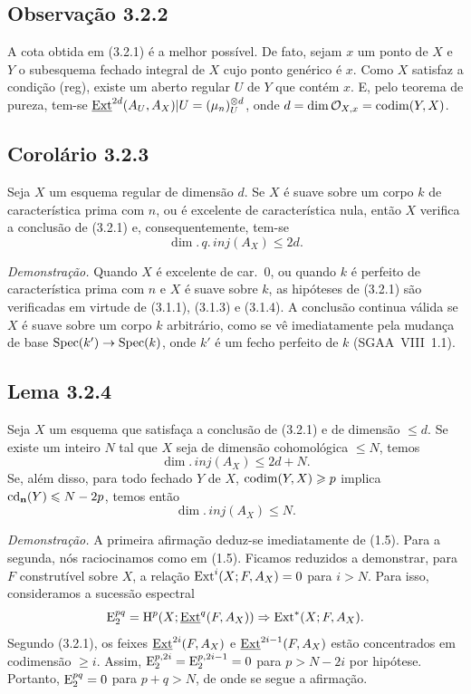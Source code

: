\subsection*{Observação 3.2.2}
A cota obtida em (3.2.1) é a melhor possível. De fato, sejam $x$ um ponto de $X$ e $Y$ o subesquema fechado integral de $X$ cujo ponto genérico é $x$. Como $X$ satisfaz a condição (reg), existe um aberto regular $U$ de $Y$ que contém $x$. E, pelo teorema de pureza, tem-se $\underline{\operatorname{Ext}}^{2d}(A_U, A_X)|U = (\mu_n)^{\otimes d}_U$, onde $d = \dim \mathcal{O}_{X,x} = \operatorname{codim}(Y,X)$.

\subsection*{Corolário 3.2.3}
Seja $X$ um esquema regular de dimensão $d$. Se $X$ é suave sobre um corpo $k$ de característica prima com $n$, ou é excelente de característica nula, então $X$ verifica a conclusão de (3.2.1) e, consequentemente, tem-se
\[
\dim.\,q.\,inj(A_X) \leqslant 2d.
\]

\emph{Demonstração.} Quando $X$ é excelente de car.~0, ou quando $k$ é perfeito de característica prima com $n$ e $X$ é suave sobre $k$, as hipóteses de (3.2.1) são verificadas em virtude de (3.1.1), (3.1.3) e (3.1.4). A conclusão continua válida se $X$ é suave sobre um corpo $k$ arbitrário, como se vê imediatamente pela mudança de base $\operatorname{Spec}(k') \to \operatorname{Spec}(k)$, onde $k'$ é um fecho perfeito de $k$ (SGAA~VIII~1.1).

\subsection*{Lema 3.2.4}
Seja $X$ um esquema que satisfaça a conclusão de (3.2.1) e de dimensão $\leqslant d$. Se existe um inteiro $N$ tal que $X$ seja de dimensão cohomológica $\leqslant N$, temos
\[
\dim.\,inj(A_X) \leqslant 2d + N.
\]
Se, além disso, para todo fechado $Y$ de $X$, $\operatorname{codim}(Y,X) \geqslant p$ implica $\operatorname{cd}_{\mathbf{n}}(Y) \leqslant N - 2p$, temos então
\[
\dim.\,inj(A_X) \leqslant N.
\]

\emph{Demonstração.} A primeira afirmação deduz-se imediatamente de (1.5). Para a segunda, nós raciocinamos como em (1.5). Ficamos reduzidos a demonstrar, para $F$ construtível sobre $X$, a relação $\operatorname{Ext}^i(X; F, A_X) = 0$ para $i > N$. Para isso, consideramos a sucessão espectral
\[
\mathrm{E}_2^{pq} = \mathrm{H}^p(X; \underline{\operatorname{Ext}}^q(F, A_X)) \Rightarrow \operatorname{Ext}^{*}(X; F, A_X).
\]
Segundo (3.2.1), os feixes $\underline{\operatorname{Ext}}^{2i}(F, A_X)$ e $\underline{\operatorname{Ext}}^{2i-1}(F, A_X)$ estão concentrados em codimensão $\geqslant i$. Assim, $\mathrm{E}_2^{p,2i} = \mathrm{E}_2^{p,2i-1} = 0$ para $p > N - 2i$ por hipótese. Portanto, $\mathrm{E}_2^{pq} = 0$ para $p+q > N$, de onde se segue a afirmação.

